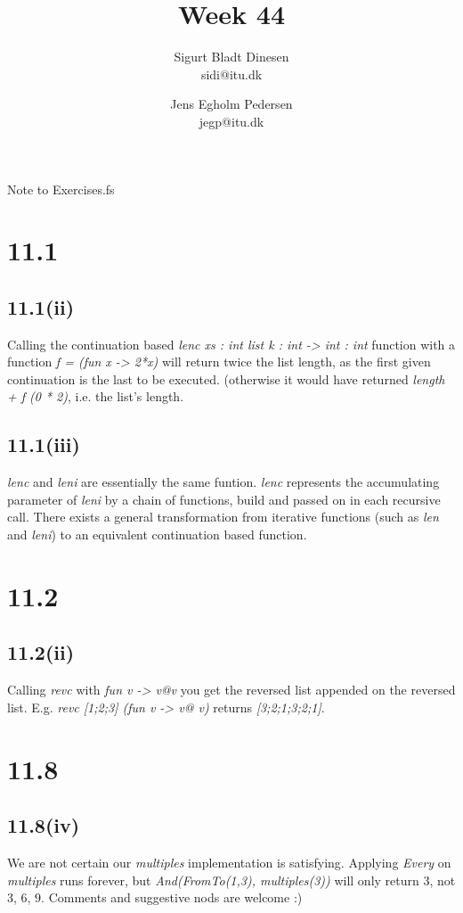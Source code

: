 \documentclass[a4paper, titlepage]{article}
\begin{document}
\title{Week 44}
\author{Sigurt Bladt Dinesen \\sidi@itu.dk 
  \and Jens Egholm Pedersen \\jegp@itu.dk}
\maketitle

Note to  Exercises.fs
\section*{11.1}
\subsection*{11.1(ii)}
Calling the continuation based \emph{lenc xs : int list k : int -> int : int}
function with a function \emph{f = (fun x -> 2*x)} will return twice the list
length, as the first given continuation is the last to be executed. (otherwise
it would have returned \emph{length + f (0 * 2)}, i.e. the list's length.

\subsection*{11.1(iii)}
\emph{lenc} and \emph{leni} are essentially the same funtion. \emph{lenc}
represents the accumulating parameter of \emph{leni} by a chain of functions,
build and passed on in each recursive call. There exists a general
transformation from iterative functions (such as \emph{len} and \emph{leni}) to
an equivalent continuation based function.

\section*{11.2}
\subsection*{11.2(ii)}
Calling \emph{revc} with \emph{fun v -> v@v} you get the reversed list appended
on the reversed list. E.g. \emph{revc [1;2;3] (fun v -> v@ v)} returns
\emph{[3;2;1;3;2;1]}.

\section*{11.8}
\subsection*{11.8(iv)}
We are not certain our \emph{multiples} implementation is satisfying.
Applying \emph{Every} on \emph{multiples} runs forever, but
\emph{And(FromTo(1,3), multiples(3))} will only return 3, not 3, 6, 9.
Comments and suggestive nods are welcome :)
\end{document}
